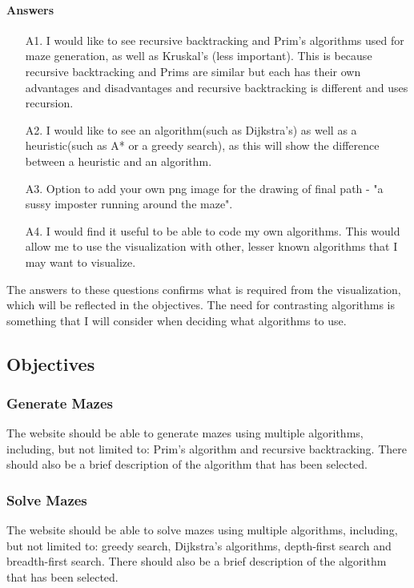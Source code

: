 \documentclass[titlepage]{article}
\begin{document}
\paragraph*{Answers}
\begin{enumerate}
    \item[A1.]I would like to see recursive backtracking and Prim's algorithms used for maze generation, as well as Kruskal's (less important). This is because recursive backtracking and Prims are similar but each has their own advantages and disadvantages and recursive backtracking is different and uses recursion.
    \item[A2.]I would like to see an algorithm(such as Dijkstra's) as well as a heuristic(such as A* or a greedy search), as this will show the difference between a heuristic and an algorithm.
    \item[A3.]Option to add your own png image for the drawing of final path - "a sussy imposter running around the maze".
    \item[A4.]I would find it useful to be able to code my own algorithms. This would allow me to use the visualization with other, lesser known algorithms that I may want to visualize.
\end{enumerate}
The answers to these questions confirms what is required from the visualization, which will be reflected in the objectives. The need for contrasting algorithms is something that I will consider when deciding what algorithms to use.
\subsection{Objectives}
\subsubsection{Generate Mazes}
The website should be able to generate mazes using multiple algorithms, including, but not limited to: Prim's algorithm and recursive backtracking. There should also be a brief description of the algorithm that has been selected.

\subsubsection{Solve Mazes}
The website should be able to solve mazes using multiple algorithms, including, but not limited to: greedy search, Dijkstra's algorithms, depth-first search and breadth-first search. There should also be a brief description of the algorithm that has been selected.
\end{document}
